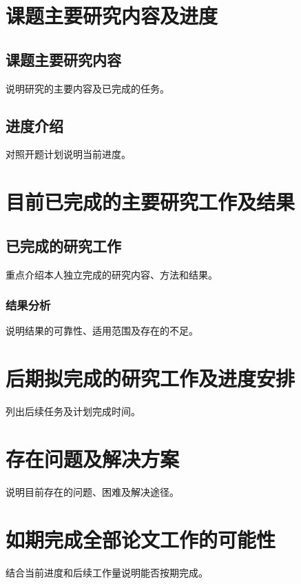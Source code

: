 \section{课题主要研究内容及进度}
\subsection{课题主要研究内容}
说明研究的主要内容及已完成的任务。
\subsection{进度介绍}
对照开题计划说明当前进度。
\section{目前已完成的主要研究工作及结果}
\subsection{已完成的研究工作}
重点介绍本人独立完成的研究内容、方法和结果。
\subsubsection{结果分析}
说明结果的可靠性、适用范围及存在的不足。
\section{后期拟完成的研究工作及进度安排}
列出后续任务及计划完成时间。
\section{存在问题及解决方案}
说明目前存在的问题、困难及解决途径。
\section{如期完成全部论文工作的可能性}
结合当前进度和后续工作量说明能否按期完成。
